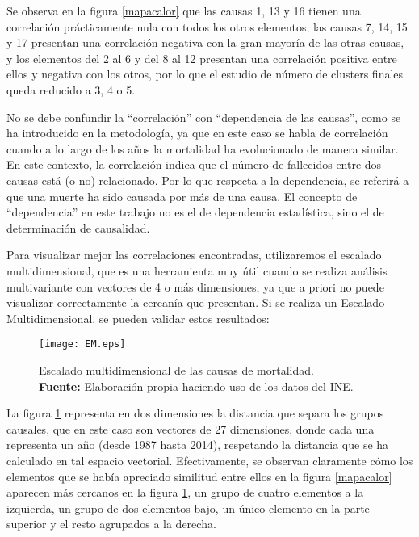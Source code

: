 \documentclass{article}
\begin{document}
Se observa en la figura \ref{mapacalor} que las causas 1, 13 y 16 tienen una correlación prácticamente nula con todos los otros elementos; las causas 7, 14, 15 y 17 presentan una correlación negativa con la gran mayoría de las otras causas, y los elementos del 2 al 6 y del 8 al 12 presentan una correlación positiva entre ellos y negativa con los otros, por lo que el estudio de número de clusters finales queda reducido a 3, 4 o 5. 

No se debe confundir la ``correlación'' con ``dependencia de las causas'', como se ha introducido en la metodología, ya que en este caso se habla de correlación cuando a lo largo de los años la mortalidad ha evolucionado de manera similar. En este contexto, la correlación indica que el número de fallecidos entre dos causas está (o no) relacionado. Por lo que respecta a la dependencia, se referirá a que una muerte ha sido causada por más de una causa. El concepto de ``dependencia'' en este trabajo no es el de dependencia estadística, sino el de determinación de causalidad.

Para visualizar mejor las correlaciones encontradas, utilizaremos el escalado multidimensional, que es una herramienta muy útil cuando se realiza análisis multivariante con vectores de 4 o más dimensiones, ya que a priori no puede visualizar correctamente la cercanía que presentan.  Si se realiza un Escalado Multidimensional, se pueden validar estos resultados:

\begin{figure}[H]
\centering
\texttt{[image: EM.eps]}
\caption{\centering Escalado multidimensional de las causas de mortalidad. \\ \textbf{Fuente:} Elaboración propia haciendo uso de los datos del INE.}
\label{em}
\end{figure}

La figura \ref{em} representa en dos dimensiones la distancia que separa los grupos causales, que en este caso son vectores de 27 dimensiones, donde cada una representa un año (desde 1987 hasta 2014), respetando la distancia que se ha calculado en tal espacio vectorial. Efectivamente, se observan claramente cómo los elementos que se había apreciado similitud entre ellos en la figura \ref{mapacalor} aparecen más cercanos en la figura \ref{em}, un grupo de cuatro elementos a la izquierda, un grupo de dos elementos bajo, un único elemento en la parte superior y el resto agrupados a la derecha.


\vspace{0.3cm}
\end{document}
